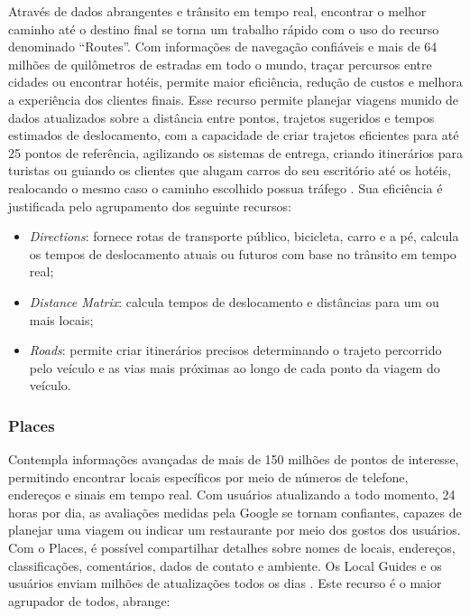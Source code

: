 Através de dados abrangentes e trânsito em tempo real, encontrar o melhor caminho até o destino final se torna um trabalho rápido com o uso do recurso denominado “Routes”. Com informações de navegação confiáveis e mais de 64 milhões de quilômetros de estradas em todo o mundo, traçar percursos entre cidades ou encontrar hotéis, permite maior eficiência, redução de custos e melhora a experiência dos clientes finais. Esse recurso permite planejar viagens munido de dados atualizados sobre a distância entre pontos, trajetos sugeridos e tempos estimados de deslocamento, com a capacidade de criar trajetos eficientes para até 25 pontos de referência, agilizando os sistemas de entrega, criando itinerários para turistas ou guiando os clientes que alugam carros do seu escritório até os hotéis, realocando o mesmo caso o caminho escolhido possua tráfego \cite{google:2019}. Sua eficiência é justificada pelo agrupamento dos seguinte recursos:

\newpage
\begin{itemize}
    \item \textit{Directions}: fornece rotas de transporte público, bicicleta, carro e a pé, calcula os tempos de deslocamento atuais ou futuros com base no trânsito em tempo real;
    \item \textit{Distance Matrix}: calcula tempos de deslocamento e distâncias para um ou mais locais;
    \item \textit{Roads}: permite criar itinerários precisos determinando o trajeto percorrido pelo veículo e as vias mais próximas ao longo de cada ponto da viagem do veículo.
\end{itemize}

\subsubsection{Places}

Contempla informações avançadas de mais de 150 milhões de pontos de interesse, permitindo encontrar locais específicos por meio de números de telefone, endereços e sinais em tempo real. Com usuários atualizando a todo momento, 24 horas por dia, as avaliações medidas pela Google se tornam confiantes, capazes de planejar uma viagem ou indicar um restaurante por meio dos gostos dos usuários. Com o Places, é possível compartilhar detalhes sobre nomes de locais, endereços, classificações, comentários, dados de contato e ambiente. Os Local Guides e os usuários enviam milhões de atualizações todos os dias \cite{google:2019}. Este recurso é o maior agrupador de todos, abrange:

